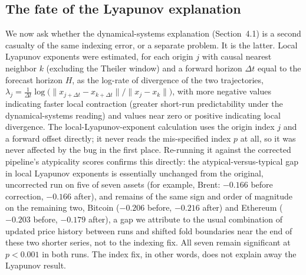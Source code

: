 \documentclass[preprint,12pt]{elsarticle}
\begin{document}
\subsection{The fate of the Lyapunov explanation}
\label{sec:lyapunov-fate}
We now ask whether the dynamical-systems explanation (Section~4.1) is a second casualty of the
same indexing error, or a separate problem. It is the latter. Local Lyapunov exponents were
estimated, for each origin $j$ with causal nearest neighbor $k$ (excluding the Theiler window)
and a forward horizon $\Delta t$ equal to the forecast horizon $H$, as the log-rate of
divergence of the two trajectories, $\lambda_j = \frac{1}{\Delta t}
\log\bigl(\lVert x_{j+\Delta t} - x_{k+\Delta t}\rVert / \lVert x_j - x_k\rVert\bigr)$, with
more negative values indicating faster local contraction (greater short-run predictability
under the dynamical-systems reading) and values near zero or positive indicating local
divergence. The local-Lyapunov-exponent calculation uses the origin index $j$ and a forward
offset directly; it never reads the mis-specified index $p$ at all, so it was never affected
by the bug in the first place. Re-running it against the corrected pipeline's atypicality
scores confirms this directly: the atypical-versus-typical gap in local Lyapunov exponents is
essentially unchanged from the original, uncorrected run on five of seven assets (for example,
Brent: $-0.166$ before correction, $-0.166$ after), and remains of the same sign and order of
magnitude on the remaining two, Bitcoin ($-0.206$ before, $-0.216$ after) and Ethereum
($-0.203$ before, $-0.179$ after), a gap we attribute to the usual combination of updated price
history between runs and shifted fold boundaries near the end of these two shorter series, not
to the indexing fix. All seven remain significant at $p<0.001$ in both runs. The index fix, in
other words, does not explain away the Lyapunov result.
\end{document}
